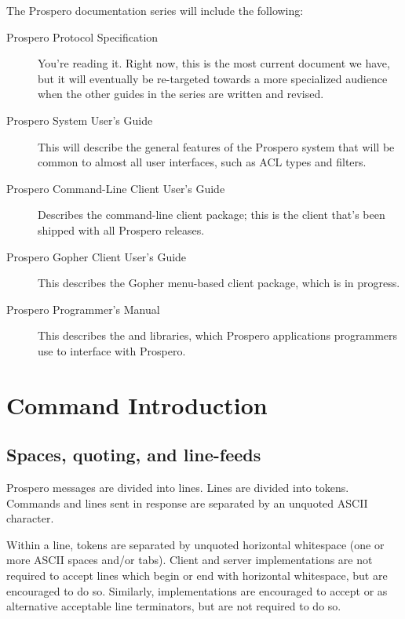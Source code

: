 The Prospero documentation series will include the following:
\begin{description}

\item[Prospero Protocol Specification]  You're reading it.  Right now,
this is the most current document we have, but it will eventually be
re-targeted towards a more specialized audience when the other guides
in the series are written and revised.

\item[Prospero System User's Guide]  This will describe the general
features of the Prospero system that will be common to almost all user
interfaces, such as ACL types and filters.

\item[Prospero Command-Line Client User's Guide] Describes the
command-line client package; this is the client that's been shipped
with all Prospero releases.

\item[Prospero Gopher Client User's Guide]  This describes the
Gopher menu-based client package, which is in progress.


\item[Prospero Programmer's Manual] This describes the 
and  libraries, which Prospero applications programmers
use to interface with Prospero.

\end{description}

\chapter{Command Introduction}

\section{Spaces, quoting, and line-feeds}

Prospero messages are divided into lines.  Lines are divided into
tokens.  Commands and lines sent in response are separated by an
unquoted {\sc ASCII}  character.

Within a line, tokens are separated by unquoted horizontal whitespace
(one or more {\sc ASCII} spaces and/or tabs).  Client and server
implementations are not required to accept lines which begin or end
with horizontal whitespace, but are encouraged to do so.  Similarly,
implementations are encouraged to accept  or
 as alternative acceptable line terminators, but are
not required to do so. 

